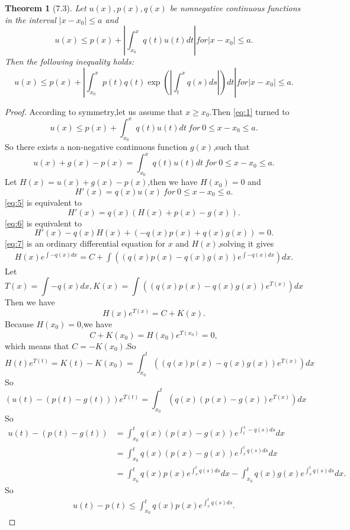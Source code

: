 \documentclass[a4paper, 12pt]{article} %
\newtheorem*{adtheorem}{Theorem}
\newenvironment{theorem}
{\bigskip\begin{mdframed}[backgroundcolor=gray!40,rightline=false,leftline=false,topline=false,bottomline=false]\begin{adtheorem}}
    {\end{adtheorem}\end{mdframed}\bigskip}
\begin{document}
\begin{theorem}[7.3]
Let $u(x),p(x),q(x)$ be nonnegative continuous functions in the
interval $|x-x_0|\leq a$ and
\begin{equation}
  \label{eq:1}
  u(x)\leq p(x)+\left|\int_{x_0}^xq(t)u(t)dt\right| for |x-x_0|\leq a.
\end{equation}
Then the following inequality holds:
\begin{equation}
  \label{eq:2}
  u(x)\leq p(x)+\left|\int_{x_0}^xp(t)q(t)\exp\left(\left
        |\int_t^xq(s)ds\right|\right)dt\right| for |x-x_0|\leq a.
\end{equation}
\end{theorem}
\begin{proof}
According to symmetry,let us assume that
$x\geq x_0$.Then \eqref{eq:1} turned  to 
\begin{equation}
  \label{eq:3}
  u(x)\leq p(x)+\int_{x_0}^xq(t)u(t)dt \ for\  0\leq x-x_{0}\leq a.
\end{equation}
So there exists a non-negative continuous function $g(x)$,such that
\begin{equation}
  \label{eq:4}
  u(x)+g(x)-p(x)=\int_{x_0}^xq(t)u(t)dt\ for\ 0\leq x-x_0\leq a.
\end{equation}
Let $H(x)=u(x)+g(x)-p(x)$,then we have $H(x_0)=0$ and 
\begin{equation}
  \label{eq:5}
  H'(x)=q(x)u(x)\ for \ 0\leq x-x_0\leq a.
\end{equation}
\eqref{eq:5} is equivalent to
\begin{equation}
  \label{eq:6}
  H'(x)=q(x)(H(x)+p(x)-g(x)).
\end{equation}
\eqref{eq:6} is equivalent to
\begin{equation}\label{eq:7}
  H'(x)-q(x)H(x)+(-q(x)p(x)+q(x)g(x))=0.
\end{equation}
\eqref{eq:7} is an ordinary differential equation for $x$ and
$H(x)$,solving it gives
\begin{align*}
  H(x)e^{\int -q(x)dx}=C+\int \left((q(x)p(x)-q(x)g(x))e^{\int -q(x)dx}\right)dx.
\end{align*}
Let 
$$
T(x)=\int -q(x)dx,K(x)=\int \left((q(x)p(x)-q(x)g(x))e^{T(x)}\right)dx
$$
Then we have
$$
H(x)e^{T(x)}=C+K(x).
$$
Because $H(x_0)=0$,we have
$$
C+K(x_0)=H(x_0)e^{T(x_0)}=0,
$$
which means that $C=-K(x_0)$.So
$$
H(t)e^{T(t)}=K(t)-K(x_0)=\int_{x_0}^t \left((q(x)p(x)-q(x)g(x))e^{T(x)}\right)dx
$$
So
$$
(u(t)-(p(t)-g(t)))e^{T(t)}=\int_{x_0}^t\left(q(x)(p(x)-g(x))e^{T(x)}\right)dx
$$
So
\begin{align*}
  u(t)-(p(t)-g(t))&=\int_{x_0}^tq(x)(p(x)-g(x))e^{\int_t^x
    -q(s)ds}dx\\&=\int_{x_0}^tq(x)(p(x)-g(x))e^{\int_x^t
    q(s)ds}dx\\&=\int_{x_0}^tq(x)p(x)e^{\int_x^t
    q(s)ds}dx-\int_{x_0}^tq(x)g(x)e^{\int_x^tq(s)ds}dx.
\end{align*}
So
\begin{align*}
  u(t)-p(t)\leq \int_{x_0}^tq(x)p(x)e^{\int_x^tq(s)ds}.
\end{align*}
\end{proof}
\end{document}
